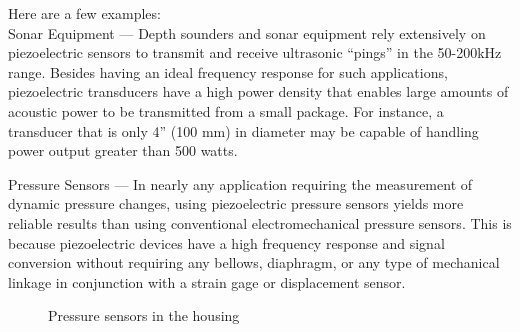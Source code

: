 \documentclass[a4paper,14pt]{extreport}
\begin{document}
Here are a few examples:\\

Sonar Equipment — Depth sounders and sonar equipment rely extensively on piezoelectric sensors to transmit and receive ultrasonic “pings” in the 50-200kHz range. Besides having an ideal frequency response for such applications, piezoelectric transducers have a high power density that enables large amounts of acoustic power to be transmitted from a small package. For instance, a transducer that is only 4” (100 mm) in diameter may be capable of handling power output greater than 500 watts.\\
\begin{figure}[h!]
\end{figure}



Pressure Sensors — In nearly any application requiring the measurement of dynamic pressure changes, using piezoelectric pressure sensors yields more reliable results than using conventional electromechanical pressure sensors. This is because piezoelectric devices have a high frequency response and signal conversion without requiring any bellows, diaphragm, or any type of mechanical linkage in conjunction with a strain gage or displacement sensor.\\
\begin{figure}[h!]
\caption{Pressure sensors in the housing}
\end{figure}
\end{document}
